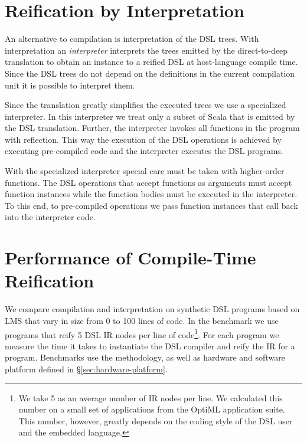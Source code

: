 \section{Reification by Interpretation}
\label{sec:reification-by-interpretation}

An alternative to compilation is interpretation of the DSL trees. With interpretation
 an \emph{interpreter} interprets the trees emitted by the direct-to-deep translation to obtain
 an instance to a reified DSL at host-language compile time. Since the DSL trees do not depend
 on the definitions in the current compilation unit it is possible to interpret them.

Since the \yy translation greatly simplifies the executed trees we use a specialized interpreter.
 In this interpreter we treat only a subset of Scala that is emitted by the DSL translation.
 Further, the interpreter invokes all functions in the program with reflection. This way the
 execution of the DSL operations is achieved by executing pre-compiled code and the interpreter
 executes the DSL programs.

With the specialized interpreter special care must be taken with higher-order functions. The DSL operations
 that accept functions as arguments must accept function instances while the
 function bodies must be executed in the interpreter. To this end, to pre-compiled
 operations we pass function instances that call back into the interpreter code.

\section{Performance of Compile-Time Reification}
\label{sec:performance-of-host-langauge-compile-time-reification}

We compare compilation and interpretation on synthetic DSL programs based on LMS that vary in size from
 0 to 100 lines of code. In the benchmark we use programs that reify 5 DSL IR nodes
 per line of code\footnote{We take 5 as an average number of IR nodes per line. We calculated this number on a small set of applications from the OptiML application suite. This number, however, greatly depends on the coding style of the DSL user and the embedded language.}. For each program we measure the time it takes to instantiate the DSL compiler and
 reify the IR for a program. Benchmarks use the methodology, as well as hardware
 and software platform defined in \S \ref{sec:hardware-platform}.

